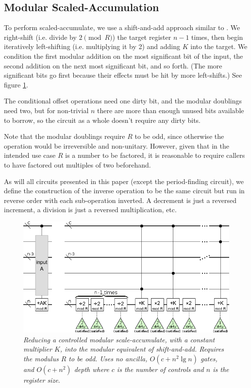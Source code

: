 \documentclass[twocolumn]{article}
\begin{document}
\subsection{Modular Scaled-Accumulation}

To perform scaled-accumulate, we use a shift-and-add approach similar to \cite{beauregard2003}.
We right-shift (i.e. divide by $2 {\pmod R}$) the target register $n-1$ times, then begin iteratively left-shifting (i.e. multiplying it by 2) and adding $K$ into the target.
We condition the first modular addition on the most significant bit of the input, the second addition on the next most significant bit, and so forth.
(The more significant bits go first because their effects must be hit by more left-shifts.)
See figure \ref{fig:controlled-modular-scale-accumulate}.

The conditional offset operations need one dirty bit, and the modular doublings need two, but for non-trivial $n$ there are more than enough unused bits available to borrow, so the circuit as a whole doesn't require any dirty bits.

Note that the modular doublings require $R$ to be odd, since otherwise the operation would be irreversible and non-unitary.
However, given that in the intended use case $R$ is a number to be factored, it is reasonable to require callers to have factored out multiples of two beforehand.

As will all circuits presented in this paper (except the period-finding circuit), we define the construction of the inverse operation to be the same circuit but run in reverse order with each sub-operation inverted.
A decrement is just a reversed increment, a division is just a reversed multiplication, etc.

\begin{figure}
  \centering
  \includegraphics[width=\linewidth]{assets/controlled-modular-multiply-accumulate.png}
  \caption{\em
    Reducing a controlled modular scale-accumulate, with a constant multiplier $K$, into the modular equivalent of shift-and-add.
    Requires the modulus $R$ to be odd.
    Uses no ancilla, $O(c + n^2 \lg n)$ gates, and $O(c + n^2)$ depth where $c$ is the number of controls and $n$ is the register size.
  }
  \label{fig:controlled-modular-scale-accumulate}
\end{figure}
\end{document}
